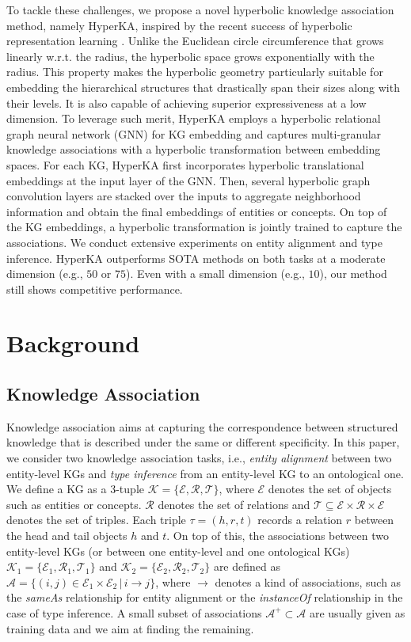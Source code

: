 \documentclass[11pt,a4paper]{article}
\newcommand{\modelname}{HyperKA\xspace}
\begin{document}
To tackle these challenges, we propose a novel hyperbolic knowledge association method, namely \modelname, inspired by the recent success of hyperbolic representation learning \cite{NickelK17,HyperText,HyperWord}. Unlike the Euclidean circle circumference that grows linearly w.r.t. the radius, the hyperbolic space grows exponentially with the radius. This property makes the hyperbolic geometry particularly suitable for embedding the hierarchical structures that drastically span their sizes along with their levels. It is also capable of achieving superior expressiveness at a low dimension. To leverage such merit, \modelname employs a hyperbolic relational graph neural network (GNN) for KG embedding and captures multi-granular knowledge associations with a hyperbolic transformation between embedding spaces. For each KG, \modelname first incorporates hyperbolic translational embeddings at the input layer of the GNN. Then, several hyperbolic graph convolution layers are stacked over the inputs to aggregate neighborhood information and obtain the final embeddings of entities or concepts. On top of the KG embeddings, a hyperbolic transformation is jointly trained to capture the associations. We conduct extensive experiments on entity alignment and type inference. \modelname outperforms SOTA methods on both tasks at a moderate dimension (e.g., $50$ or $75$). Even with a small dimension (e.g., $10$), our method still shows competitive performance.
 \section{Background}
\label{sect:related_work}


\subsection{Knowledge Association}
Knowledge association aims at capturing the correspondence between structured knowledge that is described under the same or different specificity. In this paper, we consider two knowledge association tasks, i.e., \emph{entity alignment} between two entity-level KGs and \emph{type inference} from an entity-level KG to an ontological one. We define a KG as a 3-tuple $\mathcal{K}=\{\mathcal{E},\mathcal{R},\mathcal{T}\}$, where $\mathcal{E}$ denotes the set of objects such as entities or concepts. $\mathcal{R}$ denotes the set of relations and $\mathcal{T}\subseteq \mathcal{E}\times\mathcal{R}\times\mathcal{E}$ denotes the set of triples. Each triple $\tau=(h,r,t)$ records a relation $r$ between the head and tail objects $h$ and $t$. On top of this, the associations between two entity-level KGs (or between one entity-level and one ontological KGs) $\mathcal{K}_1=\{\mathcal{E}_1,\mathcal{R}_1,\mathcal{T}_1\}$ and $\mathcal{K}_2=\{\mathcal{E}_2,\mathcal{R}_2,\mathcal{T}_2\}$ are defined as $\mathcal{A}=\{(i,j)\in \mathcal{E}_1\times\mathcal{E}_2 \,|\,i\to j\}$, where $\to$ denotes a kind of associations, such as the \textit{sameAs} relationship for entity alignment or the \textit{instanceOf} relationship in the case of type inference. A small subset of associations $\mathcal{A}^+\subset\mathcal{A}$ are usually given as training data and we aim at finding the remaining.
\end{document}

